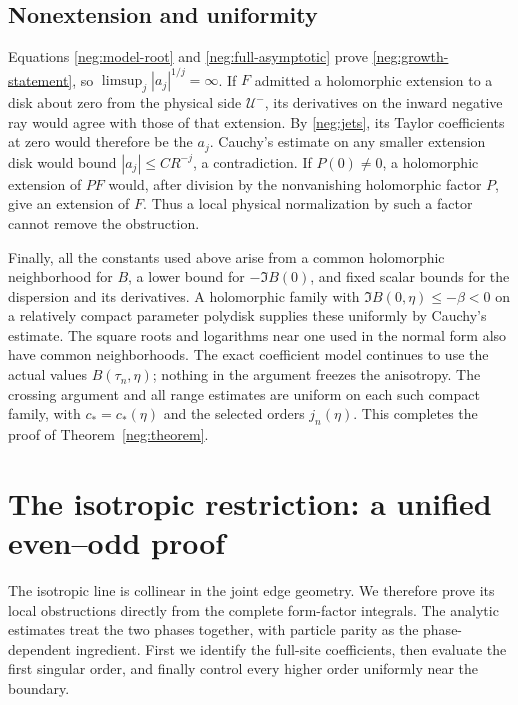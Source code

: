 \documentclass[11pt]{article}
\numberwithin{equation}{section}
\theoremstyle{definition}
\begin{document}
\subsection{Nonextension and uniformity}
\label{neg:conclusion}

Equations \eqref{neg:model-root} and
\eqref{neg:full-asymptotic} prove
\eqref{neg:growth-statement}, so
\(\limsup_j|a_j|^{1/j}=\infty\).
If \(F\) admitted a holomorphic extension to a disk about
zero from the physical side \(\mathcal U^-\), its derivatives
on the inward negative ray would agree with those of that
extension.  By \eqref{neg:jets}, its Taylor coefficients at
zero would therefore be the \(a_j\).  Cauchy's estimate on
any smaller extension disk would bound
\(|a_j|\le C R^{-j}\), a contradiction.
If \(P(0)\ne0\), a holomorphic extension of \(PF\) would,
after division by the nonvanishing holomorphic factor
\(P\), give an extension of \(F\).  Thus a local physical
normalization by such a factor cannot remove the obstruction.

Finally, all the constants used above arise from a common
holomorphic neighborhood for \(B\), a lower bound for
\(-\Im B(0)\), and fixed scalar bounds for the dispersion
and its derivatives.  A holomorphic family with
\(\Im B(0,\eta)\le-\beta<0\) on a relatively compact
parameter polydisk supplies these uniformly by Cauchy's
estimate.  The square roots and logarithms near one used
in the normal form also have common neighborhoods.
The exact coefficient model continues to use the actual
values \(B(\tau_n,\eta)\); nothing in the argument freezes
the anisotropy.  The crossing argument and all range
 estimates are uniform on each such compact family, with
 \(c_*=c_*(\eta)\) and the selected orders \(j_n(\eta)\).
This completes the proof of Theorem~\ref{neg:theorem}.


\section{The isotropic restriction: a unified even--odd proof}
\label{iso:section}

The isotropic line is collinear in the joint edge geometry. We
therefore prove its local obstructions directly from the complete
form-factor integrals. The analytic estimates treat the two phases
together, with particle parity as the phase-dependent ingredient.
First we identify the full-site coefficients, then evaluate the first
singular order, and finally control every higher order uniformly
near the boundary.
\end{document}
